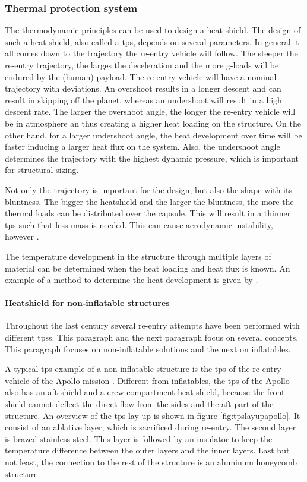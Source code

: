 \subsubsection{Thermal protection system}
The thermodynamic principles can be used to design a heat shield. The design of such a heat shield, also called a \acrfull{tps}, depends on several parameters. In general it all comes down to the trajectory the re-entry vehicle will follow. The steeper the re-entry trajectory, the larges the deceleration and the more g-loads will be endured by the (human) payload. The re-entry vehicle will have a nominal trajectory with deviations. An overshoot results in a longer descent and can result in skipping off the planet, whereas an undershoot will result in a high descent rate. The larger the overshoot angle, the longer the re-entry vehicle will be in atmosphere an thus creating a higher heat loading on the structure. On the other hand, for a larger undershoot angle, the heat development over time will be faster inducing a larger heat flux on the system. Also, the undershoot angle determines the trajectory with the highest dynamic pressure, which is important for structural sizing. 

Not only the trajectory is important for the design, but also the shape with its bluntness. The bigger the heatshield and the larger the bluntness, the more the  thermal loads can be distributed over the capsule. This will result in a thinner \gls{tps} such that less mass is needed. This can cause aerodynamic instability, however \cite{Smoot}.

The temperature development in the structure through multiple layers of material can be determined when the heat loading and heat flux is known. An example of a method to determine the heat development is given by \cite{Daryabeigi2002}.

\paragraph{Heatshield for non-inflatable structures}
Throughout the last century several re-entry attempts have been performed with different \gls{tps}s. This paragraph and the next paragraph focus on several concepts. This paragraph focuses on non-inflatable solutions and the next on inflatables. 

A typical \gls{tps} example of a non-inflatable structure is the \gls{tps} of the re-entry vehicle of the Apollo mission \cite{Pavlosky1974}. Different from inflatables, the \gls{tps} of the Apollo also has an aft shield and a crew compartment heat shield, because the front shield cannot deflect the direct flow from the sides and the aft part of the structure. An overview of the \gls{tps} lay-up is shown in figure \ref{fig:tpslayupapollo}. It consist of an ablative layer, which is sacrificed during re-entry. The second layer is brazed stainless steel. This layer is followed by an insulator to keep the temperature difference between the outer layers and the inner layers. Last but not least, the connection to the rest of the structure is an aluminum honeycomb structure.

